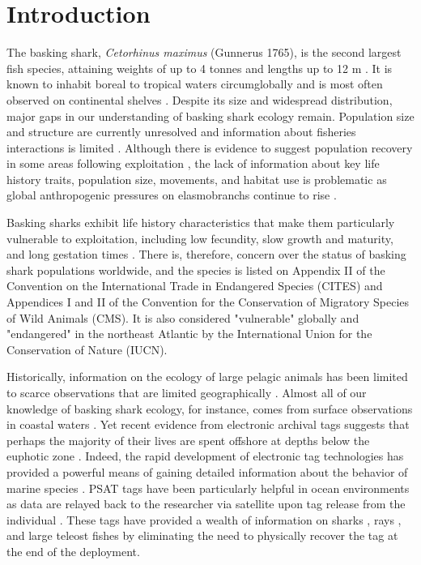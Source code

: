 \section{Introduction}
The basking shark, \textit{Cetorhinus maximus} (Gunnerus 1765), is the second largest fish species, attaining weights of up to 4 tonnes and lengths up to 12 m \citep{Sims2008}. It is known to inhabit boreal to tropical \citep{Skomal2009} waters circumglobally and is most often observed on continental shelves \citep{Sims2006}. Despite its size and widespread distribution, major gaps in our understanding of basking shark ecology remain. Population size and structure are currently unresolved and information about fisheries interactions is limited \citep{Sims2008}. Although there is evidence to suggest population recovery in some areas following exploitation \citep{Witt2012}, the lack of information about key life history traits, population size, movements, and habitat use is problematic as global anthropogenic pressures on elasmobranchs continue to rise \citep{Dulvy2008, Ferretti2010}.

Basking sharks exhibit life history characteristics that make them particularly vulnerable to exploitation, including low fecundity, slow growth and maturity, and long gestation times \citep{Compagno1984, Sims2008}. There is, therefore, concern over the status of basking shark populations worldwide, and the species is listed on Appendix II of the Convention on the International Trade in Endangered Species (CITES) and Appendices I and II of the Convention for the Conservation of Migratory Species of Wild Animals (CMS). It is also considered "vulnerable" globally and "endangered" in the northeast Atlantic by the International Union for the Conservation of Nature (IUCN).

Historically, information on the ecology of large pelagic animals has been limited to scarce observations that are limited geographically \citep{Templeman1963, SquireJr1990, Francis2002}. Almost all of our knowledge of basking shark ecology, for instance, comes from surface observations in coastal waters \citep{Sims2006, Sims2008}.  Yet recent evidence from electronic archival tags suggests that perhaps the majority of their lives are spent offshore at depths below the euphotic zone \citep{Skomal2009}. Indeed, the rapid development of electronic tag technologies has provided a powerful means of gaining detailed information about the behavior of marine species \citep{Block2011}. PSAT tags have been particularly helpful in ocean environments as data are relayed back to the researcher via satellite upon tag release from the individual \citep[\emph{e.g.}][]{Block2011}. These tags have provided a wealth of information on sharks \citep{Werry2014, Berumen2014}, rays \citep{Braun2014, Thorrold2014a}, and large teleost fishes \citep{Braun2015a} by eliminating the need to physically recover the tag at the end of the deployment. 

